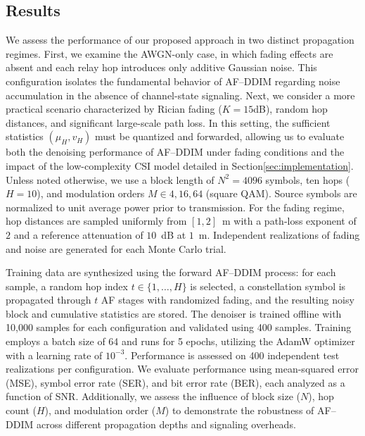 \documentclass[journal]{IEEEtran}
\begin{document}
\subsection{Results}
We assess the performance of our proposed approach in two distinct propagation regimes. First, we examine the AWGN-only case, in which fading effects are absent and each relay hop introduces only additive Gaussian noise. This configuration isolates the fundamental behavior of AF–DDIM regarding noise accumulation in the absence of channel-state signaling.
Next, we consider a more practical scenario characterized by Rician fading ($K=15$dB), random hop distances, and significant large-scale path loss. In this setting, the sufficient statistics $(\mu_H, v_H)$ must be quantized and forwarded, allowing us to evaluate both the denoising performance of AF–DDIM under fading conditions and the impact of the low-complexity CSI model detailed in Section\ref{sec:implementation}.
Unless noted otherwise, we use a block length of $N^2=4096$ symbols, ten hops ($H=10$), and modulation orders $M\in{4,16,64}$ (square QAM). Source symbols are normalized to unit average power prior to transmission. For the fading regime, hop distances are sampled uniformly from $[1,2]$~m with a path-loss exponent of $2$ and a reference attenuation of $10$~dB at $1$~m. Independent realizations of fading and noise are generated for each Monte Carlo trial.

Training data are synthesized using the forward AF--DDIM process: for each sample, a random hop index $t\in\{1,\ldots,H\}$ is selected, 
a constellation symbol is propagated through $t$ AF stages with randomized fading, and the resulting noisy block and cumulative statistics are stored. 
The denoiser is trained offline with 10,000 samples for each configuration and validated using 400 samples. Training employs a batch size of 64 and runs for 5 epochs, utilizing the AdamW optimizer with a learning rate of $10^{-3}$. Performance is assessed on 400 independent test realizations per configuration.
We evaluate performance using mean-squared error (MSE), symbol error rate (SER), and bit error rate (BER), each analyzed as a function of SNR. Additionally, we assess the influence of block size ($N$), hop count ($H$), and modulation order ($M$) to demonstrate the robustness of AF–DDIM across different propagation depths and signaling overheads.
\end{document}
